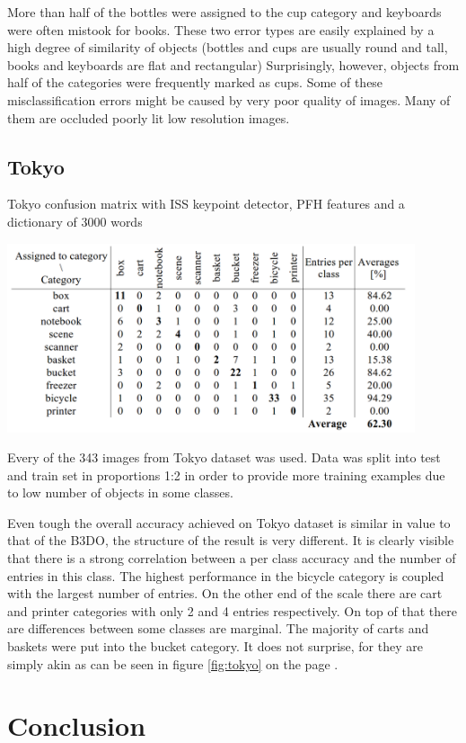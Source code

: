 	More than half of the bottles were assigned to the cup category and keyboards were often mistook for books. These two error types are easily explained by a high degree of similarity of objects (bottles and cups are usually round and tall, books and keyboards are flat and rectangular) Surprisingly, however, objects from half of the categories were frequently marked as cups. Some of these misclassification errors might be caused by very poor quality of images. Many of them are occluded poorly lit low resolution images.	
	
	\subsection{Tokyo}
	\begin{table}[!ht]
	\centering
	\caption{Tokyo confusion matrix with ISS keypoint detector, PFH features and a dictionary of 3000 words}
	\includegraphics[width=0.9\textwidth]{figs/tokyo_conf_matrix}	
	\label{tab:tokyo_conf_matrix}
	\end{table}
	
	Every of the 343 images from Tokyo dataset was used. Data was split into test and train set in proportions 1:2 in order to provide more training examples due to low number of objects in some classes.
	
	Even tough the overall accuracy achieved on Tokyo dataset is similar in value to that of the B3DO, the structure of the result is very different. It is clearly visible that there is a strong correlation between a per class accuracy and the number of entries in this class. The highest performance in the bicycle category is coupled with the largest number of entries. On the other end of the scale there are cart and printer categories with only 2 and 4 entries respectively. On top of that there are differences between some classes are marginal. The majority of carts and baskets were put into the bucket category. It does not surprise, for they are simply akin as can be seen in figure \ref{fig:tokyo} on the page \pageref{fig:tokyo}.
	
\section{Conclusion}
	